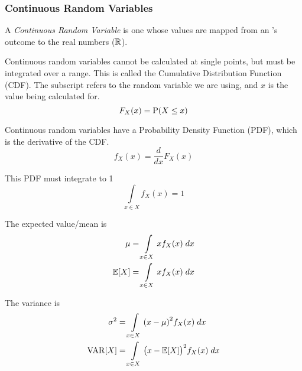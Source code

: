 \subsubsection{Continuous Random Variables}\label{subsubsec:Continuous_Random_Variables}
\begin{definition}\label{def:Continuous_Random_Variable}
  A \emph{Continuous Random Variable} is one whose values are mapped from an 's outcome to the real numbers ($\operatorname{\mathbb{R}}$).

  Continuous random variables cannot be calculated at single points, but must be integrated over a range.
  This is called the Cumulative Distribution Function (CDF).
  The subscript refers to the random variable we are using, and $x$ is the value being calculated for.
  \begin{equation}\label{eq:Continuous_Random_Variable-CDF}
    F_{X}(x) = \operatorname{\operatorname{P}}(X \leq x)
  \end{equation}

  Continuous random variables have a Probability Density Function (PDF), which is the derivative of the CDF.\
  \begin{equation}\label{eq:Continuous_Random_Variable-PDF}
    f_{X}(x) = \frac{d}{dx} F_{X}(x)
  \end{equation}

  This PDF must integrate to 1
  \begin{equation}\label{eq:Continuous_Random_Variable-Integrate_to_One}
    \int\limits_{x \in X} f_{X}(x) = 1
  \end{equation}

  The expected value/mean is
  \begin{equation}\label{eq:Continuous_Random_Variable-Expected_Value}
    \begin{aligned}
      \mu &= \int\limits_{x \in X} x f_{X}(x) \; dx \\
      \operatorname{\operatorname{\mathbb{E}}}[X] &= \int\limits_{x \in X} x f_{X}(x) \; dx \\
    \end{aligned}
  \end{equation}

  The variance is
  \begin{equation}\label{eq:Continuous_Random_Variable-Variance}
    \begin{aligned}
      \sigma^{2} &= \int\limits_{x \in X} {(x - \mu)}^{2} f_{X}(x) \; dx \\
      \operatorname{\operatorname{VAR}}[X] &= \int\limits_{x \in X} {\bigl( x - \operatorname{\operatorname{\mathbb{E}}}[X] \bigr)}^{2} f_{X}(x) \; dx
    \end{aligned}
  \end{equation}
\end{definition}

